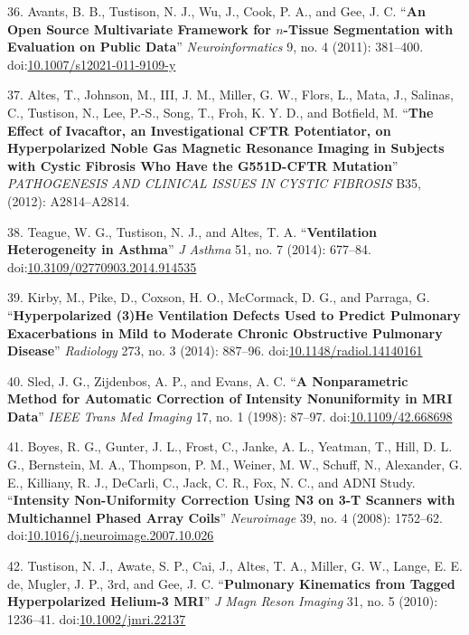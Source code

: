 \documentclass[11pt,]{article}
\begin{document}
36. Avants, B. B., Tustison, N. J., Wu, J., Cook, P. A., and Gee, J. C.
``\textbf{An Open Source Multivariate Framework for $n$-Tissue
Segmentation with Evaluation on Public Data}'' \emph{Neuroinformatics}
9, no. 4 (2011): 381--400.
doi:\href{http://dx.doi.org/10.1007/s12021-011-9109-y}{10.1007/s12021-011-9109-y}

37. Altes, T., Johnson, M., III, J. M., Miller, G. W., Flors, L., Mata,
J., Salinas, C., Tustison, N., Lee, P.-S., Song, T., Froh, K. Y. D., and
Botfield, M. ``\textbf{The Effect of Ivacaftor, an Investigational CFTR
Potentiator, on Hyperpolarized Noble Gas Magnetic Resonance Imaging in
Subjects with Cystic Fibrosis Who Have the G551D-CFTR Mutation}''
\emph{PATHOGENESIS AND CLINICAL ISSUES IN CYSTIC FIBROSIS} B35, (2012):
A2814--A2814.

38. Teague, W. G., Tustison, N. J., and Altes, T. A.
``\textbf{Ventilation Heterogeneity in Asthma}'' \emph{J Asthma} 51, no.
7 (2014): 677--84.
doi:\href{http://dx.doi.org/10.3109/02770903.2014.914535}{10.3109/02770903.2014.914535}

39. Kirby, M., Pike, D., Coxson, H. O., McCormack, D. G., and Parraga,
G. ``\textbf{Hyperpolarized (3)He Ventilation Defects Used to Predict
Pulmonary Exacerbations in Mild to Moderate Chronic Obstructive
Pulmonary Disease}'' \emph{Radiology} 273, no. 3 (2014): 887--96.
doi:\href{http://dx.doi.org/10.1148/radiol.14140161}{10.1148/radiol.14140161}

40. Sled, J. G., Zijdenbos, A. P., and Evans, A. C. ``\textbf{A
Nonparametric Method for Automatic Correction of Intensity Nonuniformity
in MRI Data}'' \emph{IEEE Trans Med Imaging} 17, no. 1 (1998): 87--97.
doi:\href{http://dx.doi.org/10.1109/42.668698}{10.1109/42.668698}

41. Boyes, R. G., Gunter, J. L., Frost, C., Janke, A. L., Yeatman, T.,
Hill, D. L. G., Bernstein, M. A., Thompson, P. M., Weiner, M. W.,
Schuff, N., Alexander, G. E., Killiany, R. J., DeCarli, C., Jack, C. R.,
Fox, N. C., and ADNI Study. ``\textbf{Intensity Non-Uniformity
Correction Using N3 on 3-T Scanners with Multichannel Phased Array
Coils}'' \emph{Neuroimage} 39, no. 4 (2008): 1752--62.
doi:\href{http://dx.doi.org/10.1016/j.neuroimage.2007.10.026}{10.1016/j.neuroimage.2007.10.026}

42. Tustison, N. J., Awate, S. P., Cai, J., Altes, T. A., Miller, G. W.,
Lange, E. E. de, Mugler, J. P., 3rd, and Gee, J. C. ``\textbf{Pulmonary
Kinematics from Tagged Hyperpolarized Helium-3 MRI}'' \emph{J Magn Reson
Imaging} 31, no. 5 (2010): 1236--41.
doi:\href{http://dx.doi.org/10.1002/jmri.22137}{10.1002/jmri.22137}
\end{document}
